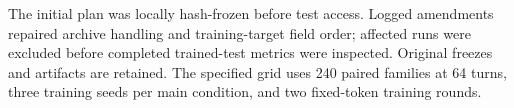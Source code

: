 The initial plan was locally hash-frozen before test access. Logged amendments repaired archive handling and training-target field order; affected runs were excluded before completed trained-test metrics were inspected. Original freezes and artifacts are retained. The specified grid uses 240 paired families at 64 turns, three training seeds per main condition, and two fixed-token training rounds.
